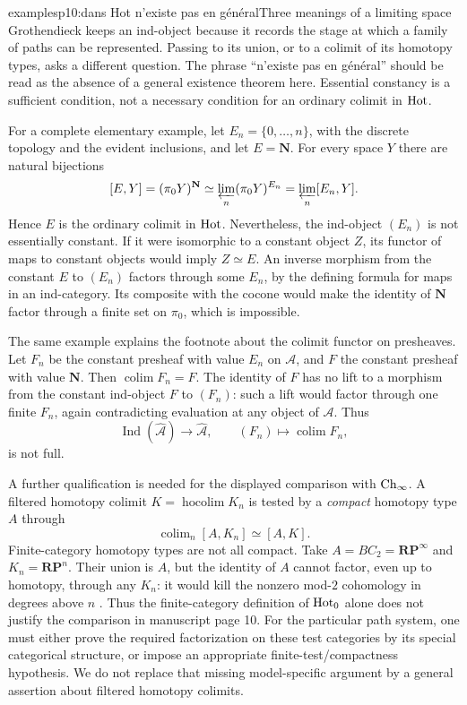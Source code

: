 \begin{dcomment}{examples}{p10:dans Hot n'existe pas en général}{Three meanings of a limiting space}
Grothendieck keeps an ind-object because it records the stage at which a family of paths can be represented. Passing to its union, or to a colimit of its homotopy types, asks a different question. The phrase ``n'existe pas en général'' should be read as the absence of a general existence theorem here. Essential constancy is a sufficient condition, not a necessary condition for an ordinary colimit in $\mathrm{Hot}$.

For a complete elementary example, let $E_n=\{0,\ldots,n\}$, with the discrete topology and the evident inclusions, and let $E=\mathbf N$. For every space $Y$ there are natural bijections
\[
 [E,Y]=(\pi_0Y)^{\mathbf N}
       \simeq\varprojlim_n(\pi_0Y)^{E_n}
       =\varprojlim_n[E_n,Y].
\]
Hence $E$ is the ordinary colimit in $\mathrm{Hot}$. Nevertheless, the ind-object $(E_n)$ is not essentially constant. If it were isomorphic to a constant object $Z$, its functor of maps to constant objects would imply $Z\simeq E$. An inverse morphism from the constant $E$ to $(E_n)$ factors through some $E_n$, by the defining formula for maps in an ind-category. Its composite with the cocone would make the identity of $\mathbf N$ factor through a finite set on $\pi_0$, which is impossible.

The same example explains the footnote about the colimit functor on presheaves. Let $F_n$ be the constant presheaf with value $E_n$ on $\mathcal A$, and $F$ the constant presheaf with value $\mathbf N$. Then $\operatorname{colim}F_n=F$. The identity of $F$ has no lift to a morphism from the constant ind-object $F$ to $(F_n)$: such a lift would factor through one finite $F_n$, again contradicting evaluation at any object of $\mathcal A$. Thus
\[
 \operatorname{Ind}(\widehat{\mathcal A})
       \longrightarrow\widehat{\mathcal A},\qquad
 (F_n)\longmapsto\operatorname{colim}F_n,
\]
is not full.

A further qualification is needed for the displayed comparison with $\mathrm{Ch}_\infty$. A filtered homotopy colimit $K=\operatorname{hocolim}K_n$ is tested by a \emph{compact} homotopy type $A$ through
\[
 \operatorname{colim}_n[A,K_n]\simeq[A,K].
\]
Finite-category homotopy types are not all compact. Take $A=BC_2=\mathbf{RP}^{\infty}$ and $K_n=\mathbf{RP}^{n}$. Their union is $A$, but the identity of $A$ cannot factor, even up to homotopy, through any $K_n$: it would kill the nonzero mod-$2$ cohomology in degrees above $n$ \citep[Theorem~3.19]{Hatcher2002}. Thus the finite-category definition of $\mathrm{Hot}_0$ alone does not justify the comparison in manuscript page 10. For the particular path system, one must either prove the required factorization on these test categories by its special categorical structure, or impose an appropriate finite-test/compactness hypothesis. We do not replace that missing model-specific argument by a general assertion about filtered homotopy colimits.
\end{dcomment}


